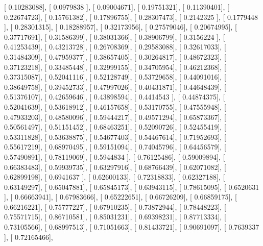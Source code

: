 \documentclass{article}
\begin{document}
       [ 0.10283088],
       [ 0.0979838 ],
       [ 0.09004671],
       [ 0.19751321],
       [ 0.11390401],
       [ 0.22674723],
       [ 0.15761382],
       [ 0.17896755],
       [ 0.28307473],
       [ 0.2142325 ],
       [ 0.1779448 ],
       [ 0.28301315],
       [ 0.18288957],
       [ 0.32173956],
       [ 0.27579046],
       [ 0.20674995],
       [ 0.37717691],
       [ 0.31586399],
       [ 0.38031366],
       [ 0.38906799],
       [ 0.3156224 ],
       [ 0.41253439],
       [ 0.43213728],
       [ 0.26708369],
       [ 0.29583088],
       [ 0.32617033],
       [ 0.31484309],
       [ 0.47959377],
       [ 0.38657405],
       [ 0.30264817],
       [ 0.48672323],
       [ 0.37123218],
       [ 0.33485448],
       [ 0.32999155],
       [ 0.34705954],
       [ 0.46212368],
       [ 0.37315087],
       [ 0.52041116],
       [ 0.52128749],
       [ 0.53729658],
       [ 0.44091016],
       [ 0.38649758],
       [ 0.39452733],
       [ 0.47997026],
       [ 0.40431871],
       [ 0.44648439],
       [ 0.51376107],
       [ 0.42659646],
       [ 0.43898594],
       [ 0.4414543 ],
       [ 0.44874375],
       [ 0.52041639],
       [ 0.53618912],
       [ 0.46157658],
       [ 0.53170755],
       [ 0.47555948],
       [ 0.47933203],
       [ 0.48580096],
       [ 0.59444217],
       [ 0.49571294],
       [ 0.65873367],
       [ 0.50561497],
       [ 0.51151452],
       [ 0.68463251],
       [ 0.52090726],
       [ 0.52455419],
       [ 0.53311828],
       [ 0.53638875],
       [ 0.54677403],
       [ 0.54467614],
       [ 0.71952693],
       [ 0.55617219],
       [ 0.68970495],
       [ 0.59151094],
       [ 0.74045796],
       [ 0.64456579],
       [ 0.57490891],
       [ 0.78119069],
       [ 0.5944834 ],
       [ 0.76125486],
       [ 0.59009894],
       [ 0.66383483],
       [ 0.59939735],
       [ 0.63297916],
       [ 0.68766439],
       [ 0.62071082],
       [ 0.62899198],
       [ 0.6941637 ],
       [ 0.62600133],
       [ 0.72318833],
       [ 0.62327188],
       [ 0.63149297],
       [ 0.65047881],
       [ 0.65845173],
       [ 0.63943115],
       [ 0.78615095],
       [ 0.6520631 ],
       [ 0.66663941],
       [ 0.67983666],
       [ 0.65222651],
       [ 0.66726209],
       [ 0.66859175],
       [ 0.66216221],
       [ 0.75777227],
       [ 0.67910235],
       [ 0.73872944],
       [ 0.78448223],
       [ 0.75571715],
       [ 0.86710581],
       [ 0.85031231],
       [ 0.69398231],
       [ 0.87713334],
       [ 0.73105566],
       [ 0.68997513],
       [ 0.71051663],
       [ 0.81433721],
       [ 0.90691097],
       [ 0.7639337 ],
       [ 0.72165466],
\end{document}
